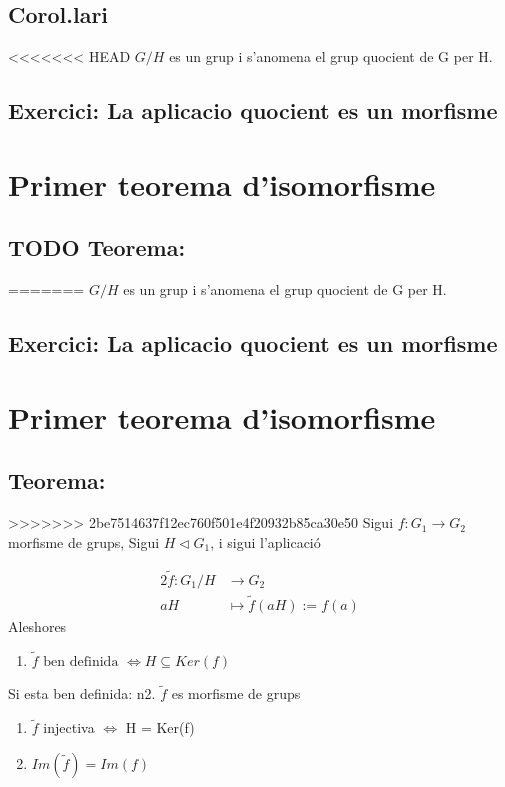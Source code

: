 \documentclass[11pt]{article}
\begin{document}
\subsection{Corol.lari}
<<<<<<< HEAD
\label{sec:org01a65fb}
\(G/H\) es un grup i s'anomena el grup quocient de G per H.
\subsection{Exercici: La aplicacio quocient es un morfisme}
\label{sec:org6aa000f}

\section{Primer teorema d'isomorfisme}
\label{sec:orgf4556b5}

\subsection{{\bfseries\sffamily TODO} Teorema:}
\label{sec:org4f685b4}
=======
\label{sec:org77bd451}
\(G/H\) es un grup i s'anomena el grup quocient de G per H.
\subsection{Exercici: La aplicacio quocient es un morfisme}
\label{sec:org92e8893}

\section{Primer teorema d'isomorfisme}
\label{sec:org237e4eb}

\subsection{Teorema:}
\label{sec:org276f6ed}
>>>>>>> 2be7514637f12ec760f501e4f20932b85ca30e50
Sigui \(f: G_1 \to G_2\) morfisme de grups, Sigui \(H \vartriangleleft G_1\), i sigui l'aplicació

\begin{alignat*}{2}
\tilde{f}: G_1/H &\to G_2 \\
aH &\mapsto \tilde{f}(aH) := f(a)
\end{alignat*}
Aleshores\\
\begin{enumerate}
\item \(\tilde{f}\text{ ben definida }\iff H \subseteq Ker(f)\)
\end{enumerate}
Si esta ben definida:
n2. \(\tilde{f}\) es morfisme de grups
\begin{enumerate}
\item \(\tilde{f}\) injectiva \(\iff\) H = Ker(f)
\item \(Im( \tilde{f} ) = Im(f)\)
\end{enumerate}
\end{document}

